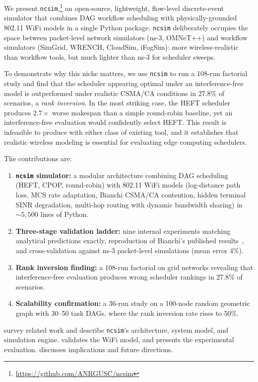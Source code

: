 \documentclass[conference]{IEEEtran}
\newcommand{\ncsim}{\texttt{ncsim}}
\begin{document}
We present \ncsim{},\footnote{\url{https://github.com/ANRGUSC/ncsim}}
an open-source, lightweight, flow-level discrete-event simulator that
combines DAG workflow scheduling with physically-grounded 802.11 WiFi
models in a single Python package.  \ncsim{} deliberately occupies the
space between packet-level network simulators (ns-3, OMNeT++) and
workflow simulators (SimGrid, WRENCH, CloudSim, iFogSim): more
wireless-realistic than workflow tools, but much lighter than ns-3 for
scheduler sweeps.

To demonstrate why this niche matters, we use \ncsim{} to run a 108-run
factorial study and find that the scheduler appearing optimal under an
interference-free model is outperformed under realistic CSMA/CA
conditions in 27.8\% of scenarios, a \emph{rank inversion}.  In the
most striking case, the HEFT scheduler produces $2.7\times$ worse
makespan than a simple round-robin baseline, yet an interference-free
evaluation would confidently select HEFT.  This result is infeasible
to produce with either class of existing tool, and it establishes
that realistic wireless modeling is essential for evaluating edge
computing schedulers.

The contributions are:

\begin{enumerate}[itemsep=2pt,leftmargin=*]
\item \textbf{\ncsim{} simulator:} a modular architecture combining DAG
  scheduling (HEFT, CPOP, round-robin) with 802.11 WiFi models
  (log-distance path loss, MCS rate adaptation, Bianchi CSMA/CA
  contention, hidden terminal SINR degradation, multi-hop routing with
  dynamic bandwidth sharing) in ${\sim}5{,}500$ lines of Python.
\item \textbf{Three-stage validation ladder:} nine internal experiments
  matching analytical predictions exactly, reproduction of Bianchi's
  published results~\cite{bianchi2000}, and cross-validation against
  ns-3 packet-level simulations (mean error 4\%).
\item \textbf{Rank inversion finding:} a 108-run factorial on grid networks
  revealing that interference-free evaluation produces wrong scheduler
  rankings in 27.8\% of scenarios.
\item \textbf{Scalability confirmation:} a 36-run study on a 100-node
  random geometric graph with 30--50 task DAGs, where the rank inversion
  rate rises to 50\%.
\end{enumerate}

 survey related work and
describe \ncsim{}'s architecture, system model, and simulation engine.
 validates the WiFi model, and 
presents the experimental evaluation.   discusses
implications and future directions.
\end{document}
